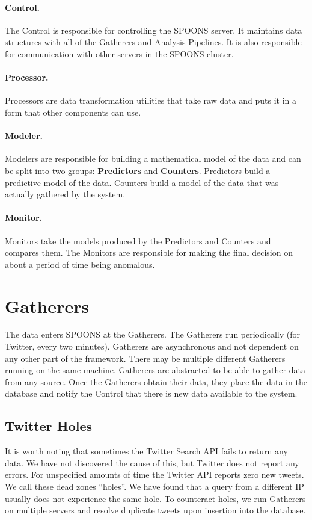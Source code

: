 \documentclass[12pt]{ucthesis}
\begin{document}
\paragraph{Control.}
The Control is responsible for controlling the SPOONS server. It maintains data structures with all of the Gatherers and
Analysis Pipelines. It is also responsible for communication with other servers in the SPOONS cluster.

\paragraph{Processor.}
Processors are data transformation utilities that take raw data and puts it in a form that other components can use.

\paragraph{Modeler.}
Modelers are responsible for building a mathematical model of the data and can be split into two groups: \textbf{Predictors} and \textbf{Counters}.
Predictors build a predictive model of the data. Counters build a model of the data that was actually gathered by the system.

\paragraph{Monitor.}
Monitors take the models produced by the Predictors and Counters and compares them. The Monitors are responsible for
making the final decision on about a period of time being anomalous.

\section{Gatherers}
\label{arch-gatherers}
The data enters SPOONS at the Gatherers. The Gatherers run periodically (for Twitter, every two minutes).
Gatherers are asynchronous and not dependent on any other part of the framework. There may be multiple different
Gatherers running on the same machine. Gatherers are abstracted to be able to gather data from any source.
Once the Gatherers obtain their data, they place the data in the database and notify the Control that there is new data
available to the system.

\subsection{Twitter Holes}
\label{arch-twitter-holes}
It is worth noting that sometimes the Twitter Search API fails to return any data. We have not discovered the cause
of this, but Twitter does not report any errors. For unspecified amounts of time the Twitter API reports zero
new tweets. We call these dead zones ``holes''. We have found that a query from a different IP usually does not
experience the same hole. To counteract holes, we run Gatherers on multiple servers and resolve duplicate tweets upon insertion
into the database.
\end{document}
